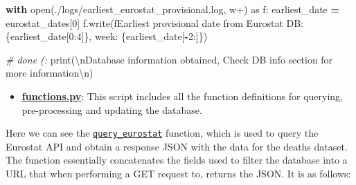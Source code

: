 \documentclass[
  a4paper]{article}
\newenvironment{Shaded}{\begin{snugshade}}{\end{snugshade}}
\newcommand{\BuiltInTok}[1]{#1}
\newcommand{\CharTok}[1]{\textcolor[rgb]{0.31,0.60,0.02}{#1}}
\newcommand{\CommentTok}[1]{\textcolor[rgb]{0.56,0.35,0.01}{\textit{#1}}}
\newcommand{\ControlFlowTok}[1]{\textcolor[rgb]{0.13,0.29,0.53}{\textbf{#1}}}
\newcommand{\DecValTok}[1]{\textcolor[rgb]{0.00,0.00,0.81}{#1}}
\newcommand{\ImportTok}[1]{#1}
\newcommand{\NormalTok}[1]{#1}
\newcommand{\OperatorTok}[1]{\textcolor[rgb]{0.81,0.36,0.00}{\textbf{#1}}}
\newcommand{\SpecialCharTok}[1]{\textcolor[rgb]{0.00,0.00,0.00}{#1}}
\newcommand{\SpecialStringTok}[1]{\textcolor[rgb]{0.31,0.60,0.02}{#1}}
\newcommand{\StringTok}[1]{\textcolor[rgb]{0.31,0.60,0.02}{#1}}
\providecommand{\tightlist}{%
  \setlength{\itemsep}{0pt}\setlength{\parskip}{0pt}}
\begin{document}
\begin{Shaded}
\begin{Highlighting}[]
\ControlFlowTok{with} \BuiltInTok{open}\NormalTok{(}\StringTok{\textquotesingle{}./logs/earliest\_eurostat\_provisional.log\textquotesingle{}}\NormalTok{, }\StringTok{\textquotesingle{}w+\textquotesingle{}}\NormalTok{) }\ImportTok{as}\NormalTok{ f:}
\NormalTok{    earliest\_date }\OperatorTok{=}\NormalTok{ eurostat\_dates[}\DecValTok{0}\NormalTok{]}
\NormalTok{    f.write(}\SpecialStringTok{f\textquotesingle{}Earliest provisional date from Eurostat DB: }\SpecialCharTok{\{}\NormalTok{earliest\_date[}\DecValTok{0}\NormalTok{:}\DecValTok{4}\NormalTok{]}\SpecialCharTok{\}}\SpecialStringTok{, week: }\SpecialCharTok{\{}\NormalTok{earliest\_date[}\OperatorTok{{-}}\DecValTok{2}\NormalTok{:]}\SpecialCharTok{\}}\SpecialStringTok{\textquotesingle{}}\NormalTok{)}

\CommentTok{\# done (:}
\BuiltInTok{print}\NormalTok{(}\StringTok{\textquotesingle{}}\CharTok{\textbackslash{}n}\StringTok{Database information obtained, Check DB info section for more information}\CharTok{\textbackslash{}n}\StringTok{\textquotesingle{}}\NormalTok{)}
\end{Highlighting}
\end{Shaded}

\normalsize

\newpage

\begin{itemize}
\tightlist
\item
  \href{https://github.com/dreth/tfm_uc3m/blob/main/api/functions.py}{\textbf{functions.py}}:
  This script includes all the function definitions for querying,
  pre-processing and updating the database.
\end{itemize}

Here we can see the
\href{https://github.com/dreth/tfm_uc3m/blob/report_ref/api/functions.py\#L22-L47}{\texttt{query\_eurostat}}
function, which is used to query the Eurostat API and obtain a response
JSON with the data for the deaths dataset. The function essentially
concatenates the fields used to filter the database into a URL that when
performing a GET request to, returns the JSON. It is as follows:

\footnotesize
\end{document}
